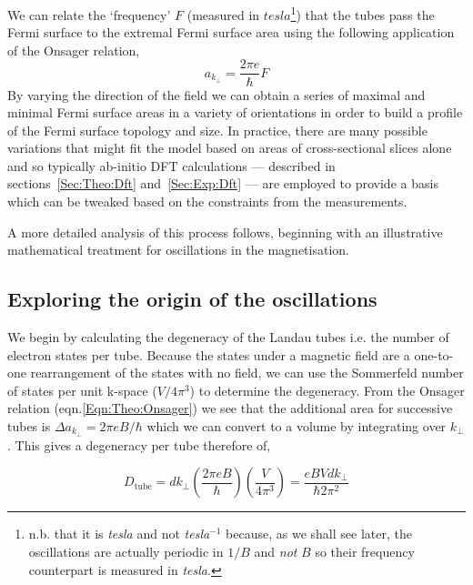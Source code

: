  We can relate the `frequency' $F$ (measured in $tesla$\footnote{n.b. that it is \textit{tesla} and not \textit{tesla$^{-1}$} because, as we shall see later, the oscillations are actually periodic in $1/B$ and \textit{not} $B$ so their frequency counterpart is measured in \textit{tesla}.}) that the tubes pass the Fermi surface to the extremal Fermi surface area using the following application of the Onsager relation,
\begin{equation}
\textit{a}_{k_{\perp}} = \frac{2\pi e }{\hbar}F
\end{equation}
By varying the direction of the field we can obtain a series of maximal and minimal Fermi surface areas in a variety of orientations in order to build a profile of the Fermi surface topology and size. In practice, there are many possible variations that might fit the model based on areas of cross-sectional slices alone and so typically ab-initio \ac{DFT} calculations --- described in sections~\ref{Sec:Theo:Dft} and~\ref{Sec:Exp:Dft} --- are employed to provide a basis which can be tweaked based on the constraints from the measurements. 

A more detailed analysis of this process follows, beginning with an illustrative mathematical treatment for oscillations in the magnetisation.

\subsection{Exploring the origin of the oscillations}

We begin by calculating the degeneracy of the Landau tubes i.e. the number of electron states per tube. Because the states under a magnetic field are a one-to-one rearrangement of the states with no field, we can use the Sommerfeld number of states per unit k-space ($V/4\pi^3$) to determine the degeneracy. From the Onsager relation (eqn.\ref{Eqn:Theo:Onsager}) we see that the additional area for successive tubes is $\Delta a_{k_{\perp}}  = 2\pi e B/\hbar$ which we can convert to a volume by integrating over $k_{\perp}$. This gives a degeneracy per tube therefore of,

\begin{equation}
D_{\textrm{tube}} = d k_{\perp}\left(\frac{2\pi e B}{\hbar}\right)\left(\frac{V}{4 \pi^3}\right) = \frac{eBVdk_{\perp}}{\hbar 2\pi^2}
\end{equation}

